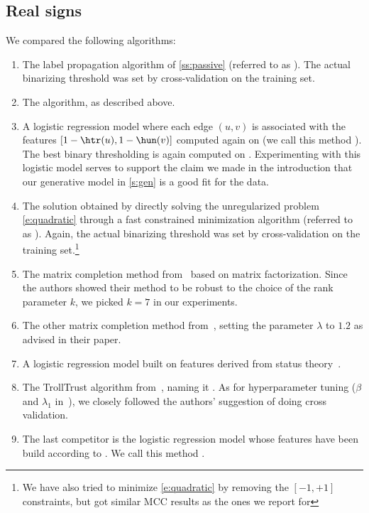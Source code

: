 \subsection{Real signs} 
We compared the following algorithms:

\begin{enumerate}[label=\textbf{\arabic*.}]
  \item The label propagation algorithm of \autoref{ss:passive} (referred to as \uslpropGsec{}).
    The actual binarizing threshold was set by cross-validation on the training set.

  \item The \usrule{} algorithm, as described above.

  \item A logistic regression model where each edge $(u,v)$ is associated with the features
    $[1-\htr(u), 1-\hun(v)]$ computed again on \trainset{} (we call this method \uslogregp{}). The best
    binary thresholding is again computed on \trainset{}. Experimenting with this logistic model
    serves to support the claim we made in the introduction that our generative model in
    \autoref{s:gen} is a good fit for the data.

  \item  The solution obtained by directly solving the unregularized problem \eqref{e:quadratic}
    through a fast constrained minimization algorithm (referred to as \qoptim{}). Again, the actual
    binarizing threshold was set by cross-validation on the training set.\footnote{We have also
    tried to minimize \eqref{e:quadratic} by removing the $[-1,+1]$ constraints, but got similar MCC
    results as the ones we report for \qoptim{}}

  \item  The matrix completion method from~\autocite{LowRankCompletion14} based on \complowrank{}
    matrix factorization. Since the authors showed their method to be robust to the choice of the
    rank parameter $k$, we picked $k=7$ in our experiments.

  \item The other \compmaxnorm{} matrix completion method from~\autocite{OnlineCompletion17},
    setting the parameter $\lambda$ to $1.2$ as advised in their paper.

  \item A logistic regression model built on \comptriads{} features derived from status
    theory~\autocite{Leskovec2010}.

  \item The TrollTrust algorithm from~\autocite{wu2016troll}, naming it \compranknodes{}. As for
    hyperparameter tuning ($\beta$ and $\lambda_1$ in~\autocite{wu2016troll}), we closely followed
    the authors' suggestion of doing cross validation.

  \item  The last competitor is the logistic regression model whose features have been build
    according to \autocite{Bayesian15}. We call this method \compbayesian{}.
\end{enumerate}

